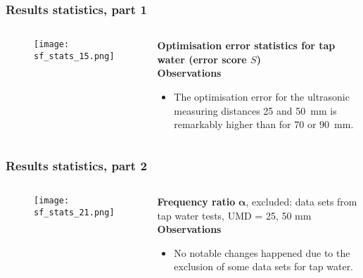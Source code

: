 	\begin{frame}
		\frametitle{Results \textendash{} statistics, part 1}\label{res:err:water:dists}
		\begin{columns}[t]
			\begin{RIPcolleft}
				\begin{figure}
					\texttt{[image: sf\_stats\_15.png]}
				\end{figure}
			\end{RIPcolleft}
			\begin{RIPcolright}
				\textbf{Optimisation error statistics for tap water (error score $S$)}\\
				\vspace*{.5em}
				\textbf{Observations}\\
				\begin{itemize}
					\item The optimisation error for the ultrasonic measuring distances 25 and 50~mm is remarkably higher than for 70 or 90~mm.
				\end{itemize}
			\end{RIPcolright}
		\end{columns}
	\end{frame}

	\begin{frame}
		\frametitle{Results \textendash{} statistics, part 2}\label{res:parerr2}
		\begin{columns}[t]
			\begin{RIPcolleft}
				\begin{figure}
					\texttt{[image: sf\_stats\_21.png]}
				\end{figure}
			\end{RIPcolleft}
			\begin{RIPcolright}
				\textbf{Frequency ratio }$\mathbf{\alpha}$, excluded: data sets from tap water tests, UMD = 25, 50 mm\\
				\vspace*{.5em}
				\textbf{Observations}\\
				\begin{itemize}
					\item No notable changes happened due to the exclusion of some data sets for tap water.
				\end{itemize}
			\end{RIPcolright}
		\end{columns}
	\end{frame}


